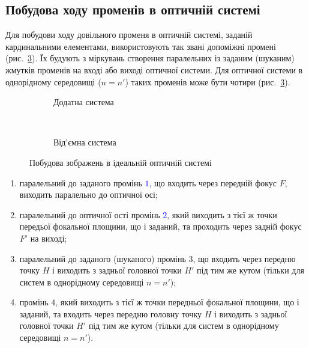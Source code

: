 \subsection{Побудова ходу променів в оптичній системі}

Для побудови ходу довільного променя в оптичній системі, заданій кардинальними
елементами, використовують так звані допоміжні промені (рис.~\ref{pic:rays_in_ideal_opt_sys}). Їх будують з міркувань створення паралельних із заданим (шуканим) жмутків променів на вході або виході оптичної системи. Для оптичної системи в однорідному середовищі ($n = n'$) таких променів може бути чотири (рис.~\ref{pic:rays_in_ideal_opt_sys}).

\begin{figure}[h!]\centering
    
    \begin{subfigure}{1\linewidth}\centering
        \caption{Додатна система}
        \label{pic:pic:rays_in_ideal_opt_sys_positive}
    \end{subfigure}
    \\
    \begin{subfigure}{1\linewidth}\centering
        \caption{Від'ємна система}
        \label{pic:rays_in_ideal_opt_sys_negative}
    \end{subfigure}
    \caption{Побудова зображень в ідеальній оптичній системі}
    \label{pic:rays_in_ideal_opt_sys}
\end{figure}

\def\bluerayO{\textcolor{blue}{$1$}}
\def\bluerayT{\textcolor{blue}{$2$}}
\def\greenrayT{\textcolor{green!50!black}{$3$}}
\def\greenrayF{\textcolor{green!50!black}{$4$}}

\begin{enumerate}
    \item паралельний до заданого промінь \bluerayO, що входить через передній фокус $F$, виходить паралельно до оптичної осі;
    \item паралельний до оптичної ості промінь \bluerayT, який виходить з тієї ж точки передьої фокальної площини, що і заданий, та проходить через задній фокус $F'$ на виході;
    \item паралельний до заданого (шуканого) промінь \greenrayT, що входить через передню точку $H$ і виходить з задньої головної точки $H'$ під тим же кутом (тільки для систем в однорідному середовищі $n = n'$);
    \item промінь \greenrayF{}, який виходить з тієї ж точки передньої фокальної площини, що і заданий, та входить через передню головну точку $H$ і виходить з задньої головної точки $H'$  під тим же кутом (тільки для систем в однорідному середовищі $n = n'$).
\end{enumerate}



